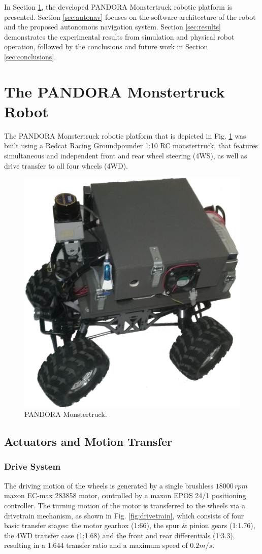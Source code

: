 \documentclass[conference]{IEEEtran}
\begin{document}
In Section \ref{sec:robot}, the developed PANDORA Monstertruck robotic platform is presented.  Section \ref{sec:autonav} focuses on the software architecture of the robot and the proposed autonomous navigation system. Section \ref{sec:results} demonstrates the experimental results from simulation and physical robot operation, followed by the conclusions and future work in Section \ref{sec:conclusions}.

\section{The PANDORA Monstertruck Robot} \label{sec:robot}
The PANDORA Monstertruck robotic platform that is depicted in Fig. \ref{fig:monstertruck} was built using a Redcat Racing Groundpounder 1:10 RC monstertruck, that features simultaneous and independent front and rear wheel steering (4WS), as well as drive transfer to all four wheels (4WD).

\begin{figure}[!ht]
	\centering
	\includegraphics[width=0.46\linewidth]{Figures/monstertruck2.png}
	\caption{PANDORA Monstertruck.}
	\label{fig:monstertruck}
\end{figure}

\subsection{Actuators and Motion Transfer}
\subsubsection{Drive System}
The driving motion of the wheels is generated by a single brushless $18000\, rpm$ maxon EC-max 283858 motor, controlled by a maxon EPOS 24/1 positioning controller. The turning motion of the motor is transferred to the wheels via a drivetrain mechanism, as shown in Fig. \ref{fig:drivetrain}, which consists of four basic transfer stages: the motor gearbox (1:66), the spur \& pinion gears (1:1.76), the 4WD transfer case (1:1.68) and the front and rear differentials (1:3.3), resulting in a 1:644 transfer ratio and a maximum speed of $0.2m/s$.
\end{document}
